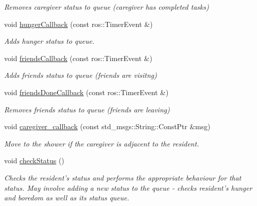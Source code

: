 \begin{DoxyCompactItemize}
\begin{DoxyCompactList}\small\item\em Removes caregiver status to queue (caregiver has completed tasks) \end{DoxyCompactList}\item 
\hypertarget{classResident_a22df12e23657cb49429d052d0168b957}{void \hyperlink{classResident_a22df12e23657cb49429d052d0168b957}{hunger\-Callback} (const ros\-::\-Timer\-Event \&)}\label{classResident_a22df12e23657cb49429d052d0168b957}

\begin{DoxyCompactList}\small\item\em Adds hunger status to queue. \end{DoxyCompactList}\item 
\hypertarget{classResident_a03c057e1ce1f34456e71a35eb1b39c93}{void \hyperlink{classResident_a03c057e1ce1f34456e71a35eb1b39c93}{friends\-Callback} (const ros\-::\-Timer\-Event \&)}\label{classResident_a03c057e1ce1f34456e71a35eb1b39c93}

\begin{DoxyCompactList}\small\item\em Adds friends status to queue (friends are visitng) \end{DoxyCompactList}\item 
\hypertarget{classResident_aa1d45bfcd3798bcd907d605cf95e467d}{void \hyperlink{classResident_aa1d45bfcd3798bcd907d605cf95e467d}{friends\-Done\-Callback} (const ros\-::\-Timer\-Event \&)}\label{classResident_aa1d45bfcd3798bcd907d605cf95e467d}

\begin{DoxyCompactList}\small\item\em Removes friends status to queue (friends are leaving) \end{DoxyCompactList}\item 
\hypertarget{classResident_a142ba60229302edcf6bc69db55ee78ca}{void \hyperlink{classResident_a142ba60229302edcf6bc69db55ee78ca}{caregiver\-\_\-callback} (const std\-\_\-msgs\-::\-String\-::\-Const\-Ptr \&msg)}\label{classResident_a142ba60229302edcf6bc69db55ee78ca}

\begin{DoxyCompactList}\small\item\em Move to the shower if the caregiver is adjacent to the resident. \end{DoxyCompactList}\item 
\hypertarget{classResident_a68e4438b39d8a0bacf1d85254587b029}{void \hyperlink{classResident_a68e4438b39d8a0bacf1d85254587b029}{check\-Status} ()}\label{classResident_a68e4438b39d8a0bacf1d85254587b029}

\begin{DoxyCompactList}\small\item\em Checks the resident's status and performs the appropriate behaviour for that status. May involve adding a new status to the queue -\/ checks resident's hunger and boredom as well as its status queue. \end{DoxyCompactList}\end{DoxyCompactItemize}
